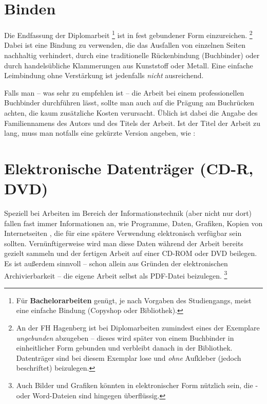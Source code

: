 \section{Binden}

Die Endfassung der Diplomarbeit%
\footnote{Für \textbf{Bachelorarbeiten} genügt, je nach Vorgaben des Studiengangs, meist eine einfache Bindung (Copyshop oder Bibliothek).}
ist in fest gebundener Form
einzureichen.%
\footnote{An der FH Hagenberg ist bei Diplomarbeiten zumindest eines der
Exemplare \emph{ungebunden} abzugeben -- dieses wird später von einem
Buchbinder in einheitlicher Form gebunden und verbleibt
danach in der Bibliothek. Datenträger sind bei diesem Exemplar lose 
und \emph{ohne} Aufkleber (jedoch beschriftet) beizulegen.}
Dabei ist eine Bindung zu
verwenden, die das Ausfallen von einzelnen Seiten nachhaltig
verhindert, \zB durch eine traditionelle Rückenbindung
(Buchbinder) oder durch handelsübliche Klammerungen aus Kunststoff
oder Metall. Eine einfache Leimbindung ohne Verstärkung ist
jedenfalls \emph{nicht} ausreichend.


Falls man -- was sehr zu empfehlen ist -- die Arbeit bei einem
professionellen Buchbinder durchführen lässt, sollte man auch auf
die Prägung am Buchrücken achten, die kaum zusätzliche Kosten
verursacht. Üblich ist dabei die Angabe des Familiennamens des
Autors und des Titels der Arbeit. Ist der Titel der Arbeit zu
lang, muss man notfalls eine gekürzte  Version angeben, wie \zB:
%
\begin{center}
\setlength{\fboxsep}{3mm}
\end{center}
%



\section{Elektronische Datenträger (CD-R, DVD)}
Speziell bei Arbeiten im Bereich der Informationstechnik (aber
nicht nur dort) fallen fast immer Informationen an, wie Programme,
Daten, Grafiken, Kopien von Internetseiten \usw, die für eine
spätere Verwendung elektronisch verfügbar sein sollten.
Vernünftigerweise wird man diese Daten während der Arbeit bereits
gezielt sammeln und der fertigen Arbeit auf einer CD-ROM oder DVD
beilegen. Es ist außerdem sinnvoll -- schon allein aus Gründen der
elektronischen Archivierbarkeit -- die eigene Arbeit selbst als
PDF-Datei beizulegen.%
\footnote{Auch Bilder und Grafiken könnten in elektronischer Form nützlich
sein, die \latex- oder Word-Dateien sind hingegen überflüssig.}


